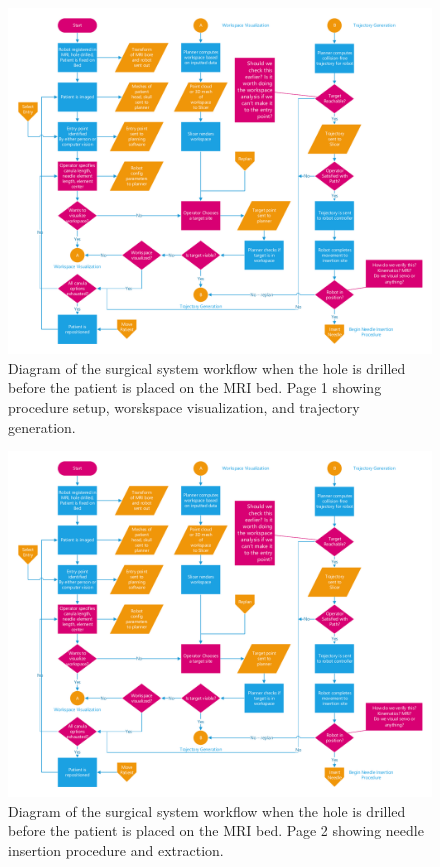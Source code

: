 \documentclass[12pt]{report}
\begin{document}
\begin{figure}[thpb]
	\centering
	\includegraphics[page=1,width=\textwidth]{diagrams/Surgical_Workflow_-_Hole_Predrilled.pdf}
    \caption{Diagram of the surgical system workflow when the hole is drilled before the patient is placed on the MRI bed. Page 1 showing procedure setup, worskspace visualization, and trajectory generation.}
    \label{fig:surgicalWorkflowPg1}
\end{figure}

\begin{figure}[thpb]
	\centering
    \includegraphics[page=2,width=\textwidth]{diagrams/Surgical_Workflow_-_Hole_Predrilled.pdf}
    \caption{Diagram of the surgical system workflow when the hole is drilled before the patient is placed on the MRI bed. Page 2 showing needle insertion procedure and extraction.}
    \label{fig:surgicalWorkflowPg2}
\end{figure}
\end{document}
